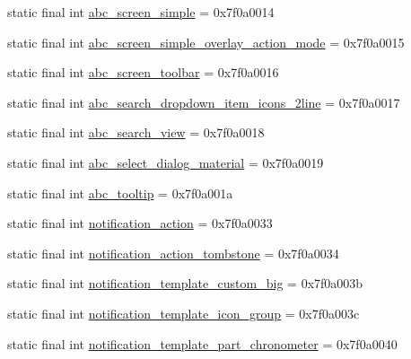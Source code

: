\begin{DoxyCompactItemize}
\item 
static final int \mbox{\hyperlink{classcom_1_1synnapps_1_1carouselview_1_1_r_1_1layout_ac8117e47557432caa1d463cc9b1f242a}{abc\+\_\+screen\+\_\+simple}} = 0x7f0a0014
\item 
static final int \mbox{\hyperlink{classcom_1_1synnapps_1_1carouselview_1_1_r_1_1layout_ab5f65ffeb1a3b69d137af261d2fb98f4}{abc\+\_\+screen\+\_\+simple\+\_\+overlay\+\_\+action\+\_\+mode}} = 0x7f0a0015
\item 
static final int \mbox{\hyperlink{classcom_1_1synnapps_1_1carouselview_1_1_r_1_1layout_ad919336569967d61c1405b2ca99edcb9}{abc\+\_\+screen\+\_\+toolbar}} = 0x7f0a0016
\item 
static final int \mbox{\hyperlink{classcom_1_1synnapps_1_1carouselview_1_1_r_1_1layout_a9999cc78914d76248aa64ef09aa81b15}{abc\+\_\+search\+\_\+dropdown\+\_\+item\+\_\+icons\+\_\+2line}} = 0x7f0a0017
\item 
static final int \mbox{\hyperlink{classcom_1_1synnapps_1_1carouselview_1_1_r_1_1layout_a99338625813113af20966b6210d96367}{abc\+\_\+search\+\_\+view}} = 0x7f0a0018
\item 
static final int \mbox{\hyperlink{classcom_1_1synnapps_1_1carouselview_1_1_r_1_1layout_ae919b470f6ecaf6fb83b13aa3a9276c2}{abc\+\_\+select\+\_\+dialog\+\_\+material}} = 0x7f0a0019
\item 
static final int \mbox{\hyperlink{classcom_1_1synnapps_1_1carouselview_1_1_r_1_1layout_ad681a25c87c87105759dca01e083efae}{abc\+\_\+tooltip}} = 0x7f0a001a
\item 
static final int \mbox{\hyperlink{classcom_1_1synnapps_1_1carouselview_1_1_r_1_1layout_a4c3b850fbcc905fd1e7120b31ac6dc48}{notification\+\_\+action}} = 0x7f0a0033
\item 
static final int \mbox{\hyperlink{classcom_1_1synnapps_1_1carouselview_1_1_r_1_1layout_a3f469d4a1a4623c523e00fd8f2c51a29}{notification\+\_\+action\+\_\+tombstone}} = 0x7f0a0034
\item 
static final int \mbox{\hyperlink{classcom_1_1synnapps_1_1carouselview_1_1_r_1_1layout_a3c44b4d88c30e8f5956d5af309b81822}{notification\+\_\+template\+\_\+custom\+\_\+big}} = 0x7f0a003b
\item 
static final int \mbox{\hyperlink{classcom_1_1synnapps_1_1carouselview_1_1_r_1_1layout_a47ee5a2411951c99cc87fa1b6c13de19}{notification\+\_\+template\+\_\+icon\+\_\+group}} = 0x7f0a003c
\item 
static final int \mbox{\hyperlink{classcom_1_1synnapps_1_1carouselview_1_1_r_1_1layout_a8492dd94643d3ab594f67a8ed2035107}{notification\+\_\+template\+\_\+part\+\_\+chronometer}} = 0x7f0a0040

\end{DoxyCompactItemize}
